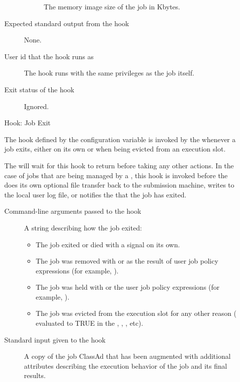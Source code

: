 \begin{itemize}
\begin{description}
\begin{description}
\item[]
  The memory image size of the job in Kbytes.
\end{description}

\item[Expected standard output from the hook]
  None.

\item[User id that the hook runs as]
  The  hook runs with the same
privileges as the job itself.

\item[Exit status of the hook]
  Ignored.
\end{description}


\item[Hook:  Job Exit]

The hook defined by the configuration variable
 is invoked by the 
whenever a job exits, either on its
own or when being evicted from an execution slot.

The  will wait for this hook to return before
taking any other actions.
In the case of jobs that are being managed by a , this
hook is invoked before the  does its own optional file
transfer back to the submission machine, writes to the local user log
file, or notifies the  that the job has exited.

\begin{description}
\item[Command-line arguments passed to the hook]
  A string describing how the job exited:
  \begin{itemize}
    \item \verb@exit@ The job exited or died with a signal on its own.
    \item \verb@remove@ The job was removed with  or as the result of
    user job policy expressions (for example, ).
    \item \verb@hold@ The job was held with  or the
    user job policy expressions (for example, ).
    \item \verb@evict@ The job was evicted from the execution slot for
    any other reason ( evaluated to TRUE in the
    , , , etc).
  \end{itemize}

\item[Standard input given to the hook]
  A copy of the job ClassAd that has been augmented with additional
  attributes describing the execution behavior of the job and its
  final results.


\end{description}
\end{itemize}

